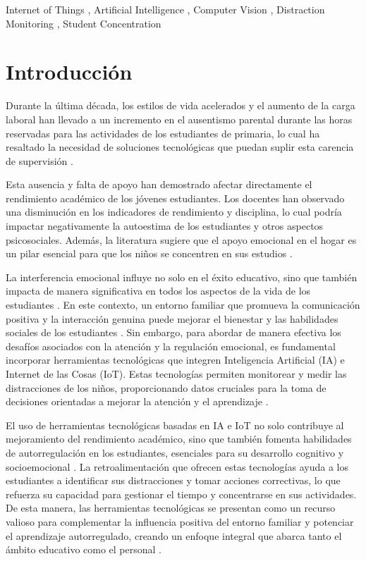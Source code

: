 \documentclass[a4paper,fleqn]{cas-sc}
\begin{document}
	\begin{keywords}
		Internet of Things \sep
		Artificial Intelligence \sep
		Computer Vision \sep
		Distraction Monitoring \sep
		Student Concentration
	\end{keywords}
	
	\maketitle
	
	\section{Introducción}
	\label{seccion:Uno}
	Durante la última década, los estilos de vida acelerados y el aumento de la carga laboral han llevado a un incremento en el ausentismo parental durante las horas reservadas para las actividades de los estudiantes de primaria, lo cual ha resaltado la necesidad de soluciones tecnológicas que puedan suplir esta carencia de supervisión \cite{Abdul-Aziz2022}.
	
	Esta ausencia y falta de apoyo han demostrado afectar directamente el rendimiento académico de los jóvenes estudiantes. Los docentes han observado una disminución en los indicadores de rendimiento y disciplina, lo cual podría impactar negativamente la autoestima de los estudiantes y otros aspectos psicosociales. Además, la literatura sugiere que el apoyo emocional en el hogar es un pilar esencial para que los niños se concentren en sus estudios \citep{Abdul-Aziz2022}.
	
	La interferencia emocional influye no solo en el éxito educativo, sino que también impacta de manera significativa en todos los aspectos de la vida de los estudiantes \citep{Ake2023}. En este contexto, un entorno familiar que promueva la comunicación positiva y la interacción genuina puede mejorar el bienestar y las habilidades sociales de los estudiantes \citep{Navarro2024}. Sin embargo, para abordar de manera efectiva los desafíos asociados con la atención y la regulación emocional, es fundamental incorporar herramientas tecnológicas que integren Inteligencia Artificial (IA) e Internet de las Cosas (IoT). Estas tecnologías permiten monitorear y medir las distracciones de los niños, proporcionando datos cruciales para la toma de decisiones orientadas a mejorar la atención y el aprendizaje \citep{Alvear-Puertas2017,Berrezueta-Guzman2021}.
	
	El uso de herramientas tecnológicas basadas en IA e IoT no solo contribuye al mejoramiento del rendimiento académico, sino que también fomenta habilidades de autorregulación en los estudiantes, esenciales para su desarrollo cognitivo y socioemocional \citep{Mohamed201862}. La retroalimentación que ofrecen estas tecnologías ayuda a los estudiantes a identificar sus distracciones y tomar acciones correctivas, lo que refuerza su capacidad para gestionar el tiempo y concentrarse en sus actividades. De esta manera, las herramientas tecnológicas se presentan como un recurso valioso para complementar la influencia positiva del entorno familiar y potenciar el aprendizaje autorregulado, creando un enfoque integral que abarca tanto el ámbito educativo como el personal \cite{Thinyane2016AUG}.
	
\end{document}
